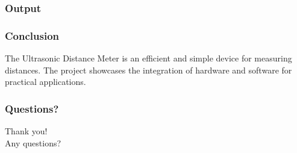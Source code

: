 \documentclass{beamer}
\begin{document}
\begin{frame}
    \frametitle{Output}
\end{frame}

\begin{frame}
    \frametitle{Conclusion}
    The Ultrasonic Distance Meter is an efficient and simple device for measuring distances. The project showcases the integration of hardware and software for practical applications.
\end{frame}

\begin{frame}
    \frametitle{Questions?}
    \centering
    Thank you! \\
    Any questions?
\end{frame}
\end{document}
